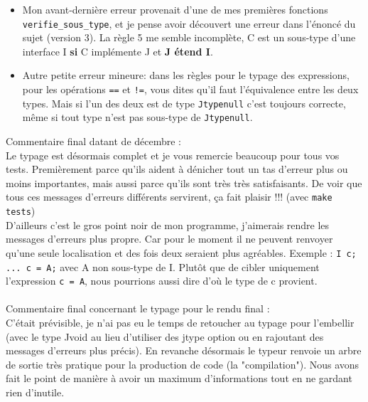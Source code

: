 \documentclass[12pt,a4paper]{report}
\begin{document}
\begin{itemize}[label=\textbullet]
\item Mon avant-dernière erreur provenait d'une de mes premières fonctions \texttt{verifie\_sous\_type}, et je pense avoir découvert une erreur dans l'énoncé du sujet (version 3). La règle 5 me semble incomplète, C est un sous-type d'une interface I \textbf{si} C implémente J et \textbf{J étend I}.
\item Autre petite erreur mineure: dans les règles pour le typage des expressions, pour les opérations \texttt{==} et \texttt{!=}, vous dites qu'il faut l'équivalence entre les deux types. Mais si l'un des deux est de type \texttt{Jtypenull} c'est toujours correcte, même si tout type n'est pas sous-type de \texttt{Jtypenull}. 
\end{itemize}

\vspace{0.8cm}
\noindent Commentaire final datant de décembre : \\
Le typage est désormais complet et je vous remercie beaucoup pour tous vos tests. Premièrement parce qu'ils aident à dénicher tout un tas d'erreur plus ou moins importantes, mais aussi parce qu'ils sont très très satisfaisants. De voir que tous ces messages d'erreurs différents servirent, ça fait plaisir !!! (avec \texttt{make tests})\\ 
D'ailleurs c'est le gros point noir de mon programme, j'aimerais rendre les messages d'erreurs plus propre. Car pour le moment il ne peuvent renvoyer qu'une seule localisation et des fois deux seraient plus agréables. Exemple : \texttt{I c; ... c = A;} avec A non sous-type de I. Plutôt que de cibler uniquement l'expression \texttt{c = A}, nous pourrions aussi dire d'où le type de c provient. \\ \\
Commentaire final concernant le typage pour le rendu final : \\
C'était prévisible, je n'ai pas eu le temps de retoucher au typage pour l'embellir (avec le type Jvoid au lieu d'utiliser des jtype option ou en rajoutant des messages d'erreurs plus précis). En revanche désormais le typeur renvoie un arbre de sortie très pratique pour la production de code (la "compilation"). Nous avons fait le point de manière à avoir un maximum d'informations tout en ne gardant rien d'inutile. 
\end{document}

